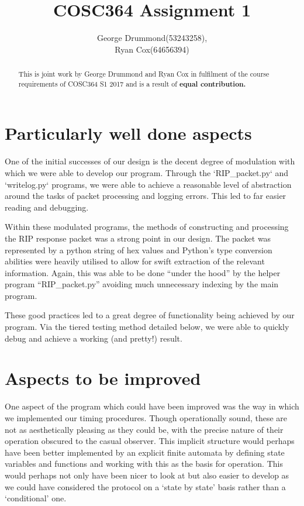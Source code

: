 \documentclass[12pt,twoside]{article}
\begin{document}
\title{COSC364 Assignment 1}
\author{George Drummond(53243258), \\Ryan Cox(64656394)}
\maketitle
\thispagestyle{empty}

\begin{abstract}
This is joint work by George Drummond and Ryan Cox in fulfilment of the course requirements of COSC364 S1 2017 and is a result of \bf{equal} contribution.
\end{abstract}

\section{ Particularly well done aspects}

One of the initial successes of our design is the decent degree of modulation with which we were able to develop our program. Through the ‘RIP\_packet.py‘ and ‘writelog.py‘ programs, we were able to achieve a reasonable level of abstraction around the tasks of packet processing and logging errors. This led to far easier reading and debugging.

Within these modulated programs, the methods of constructing and processing the RIP response packet was a strong point in our design. The packet was represented by a python string of hex values and Python’s type conversion abilities were heavily utilised to allow for swift extraction of the relevant information. Again, this was able to be done “under the hood” by the helper program “RIP\_packet.py” avoiding much unnecessary indexing by the main program.

These good practices led to a great degree of functionality being achieved by our program. Via the tiered testing method detailed below, we were able to quickly debug and achieve a working (and pretty!) result.
\section{Aspects to be improved}

One aspect of the program which could have been improved was the way in which we implemented our timing procedures. Though operationally sound, these are not as aesthetically pleasing as they could be, with the precise nature of their operation obscured to the casual observer. This implicit structure would perhaps have been better implemented by an explicit finite automata by defining state variables and functions and working with this as the basis for operation. This would perhaps not only have been nicer to look at but also easier to develop as we could have considered the protocol on a ‘state by state’ basis rather than a ‘conditional’ one.
\end{document}
